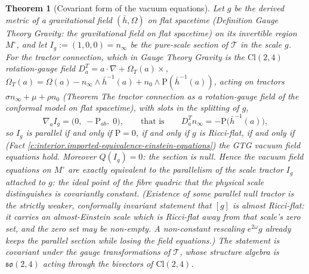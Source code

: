 \documentclass[11pt]{article}
\newtheorem{theorem}{Theorem}[section]
\theoremstyle{definition}
\theoremstyle{plain}
\newcommand{\changedmark}[2]{\marginpar{\raggedright\scriptsize\color{#1}#2}}
\providecommand{\Cl}{}\renewcommand{\Cl}{\mathrm{Cl}}
\providecommand{\Sch}{}\renewcommand{\Sch}{\mathrm{P}}
\providecommand{\hb}{}\renewcommand{\hb}{\bar{h}}
\providecommand{\nInf}{}\renewcommand{\nInf}{n_\infty}
\providecommand{\nO}{}\renewcommand{\nO}{n_0}
\begin{document}
\begin{theorem}[Covariant form of the vacuum equations]\label{c:interior.covariant-form-vacuum-equations}
\changedmark{gray}{reworded}
Let $g$ be the derived metric of a gravitational field $(\hb, \Omega)$ on flat spacetime (Definition \emph{Gauge Theory Gravity: the gravitational field on flat spacetime}) on its invertible region $M^\circ$, and let $I_g := (1, 0, 0) = \nInf$ be the pure-scale section of $\mathcal{T}$ in the scale $g$. For the tractor connection, which in Gauge Theory Gravity is the $\Cl(2,4)$ rotation-gauge field $D^{T}_{a} = a \cdot \nabla + \Omega_{T}(a)\times$, $\Omega_{T}(a) = \Omega(a) - \nInf \wedge \hb^{-1}(a) + \nO \wedge \Sch(\hb^{-1}(a))$, acting on tractors $\sigma\nInf + \mu + \rho\nO$ (Theorem \emph{The tractor connection as a rotation-gauge field of the conformal model on flat spacetime}), with slots in the splitting of $g$,
\[
\nabla_a I_g = \bigl(0,\; -\Sch_{ab},\; 0\bigr), \qquad\text{that is}\qquad D^{T}_{a}\nInf = -\Sch\bigl(\hb^{-1}(a)\bigr),
\]
so $I_g$ is parallel if and only if $\Sch = 0$, if and only if $g$ is Ricci-flat, if and only if (Fact \ref{c:interior.imported-equivalence-einstein-equations}) the GTG vacuum field equations hold. Moreover $Q(I_g) = 0$: the section is null. Hence the vacuum field equations on $M^\circ$ are exactly equivalent to the parallelism of the scale tractor $I_g$ attached to $g$: the ideal point of the fibre quadric that the physical scale distinguishes is covariantly constant. (Existence of \emph{some} parallel null tractor is the strictly weaker, conformally invariant statement that $[g]$ is almost Ricci-flat: it carries an almost-Einstein scale which is Ricci-flat away from that scale's zero set, and the zero set may be non-empty. A non-constant rescaling $e^{2\omega}g$ already keeps the parallel section while losing the field equations.) The statement is covariant under the gauge transformations of $\mathcal{T}$, whose structure algebra is $\mathfrak{so}(2,4)$ acting through the bivectors of $\Cl(2,4)$.
\end{theorem}
\end{document}
